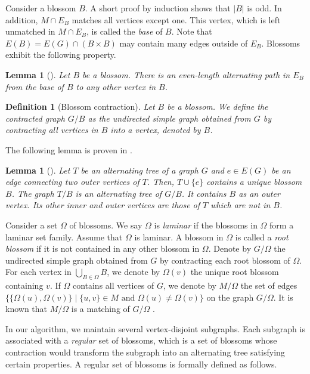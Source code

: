 \documentclass{article}
\newcommand{\Omg}{\Omega}
\newtheorem{lemma}[theorem]{Lemma}
\newtheorem{definition}[theorem]{Definition}
\begin{document}
Consider a blossom $B$.
A short proof by induction shows that $|B|$ is odd.
In addition, $M \cap E_B$ matches all vertices except one.
This vertex, which is left unmatched in $M \cap E_B$, is called the \emph{base} of $B$.
Note that $E(B) = E(G) \cap (B \times B)$ may contain many edges outside of $E_B$.
Blossoms exhibit the following property.

\begin{lemma}[\cite{DP14}]\label{lem:even_path} Let $B$ be a blossom. There is an even-length alternating path in $E_B$ from the base of $B$ to any other vertex in $B$. \end{lemma}

\begin{definition}[Blossom contraction] Let $B$ be a blossom. We define the contracted graph $G / B$ as the undirected simple graph obtained from $G$ by contracting all vertices in $B$ into a vertex, denoted by $B$.
\end{definition}

The following lemma is proven in \cite[Theorem 4.13]{edmonds1965paths}.

\begin{lemma}[\cite{edmonds1965paths}]\label{lem:contraction} Let $T$ be an alternating tree of a graph $G$ and $e \in E(G)$ be an edge connecting two outer vertices of $T$. Then, $T \cup \{e\}$ contains a unique blossom $B$. The graph $T / B$ is an alternating tree of $G / B$. It contains $B$ as an outer vertex. Its other inner and outer vertices are those of $T$ which are not in $B$.
\end{lemma}

Consider a set $\Omg$ of blossoms.
We say $\Omg$ is \emph{laminar} if the blossoms in $\Omg$ form a laminar set family.
Assume that $\Omg$ is laminar.
A blossom in $\Omg$ is called a \emph{root blossom} if it is not contained in any other blossom in $\Omg$.
Denote by $G / \Omg$ the undirected simple graph obtained from $G$ by contracting each root blossom of $\Omg$.
For each vertex in $\bigcup_{B \in \Omg} B$, we denote by $\Omg(v)$ the unique root blossom containing $v$.
If $\Omg$ contains all vertices of $G$, we denote by $M / \Omg$ the set of edges $\{ \{\Omg(u), \Omg(v)\} \mid \{u, v\} \in M \mbox{ and } \Omg(u) \neq \Omg(v) \}$ on the graph $G / \Omg$. It is known that $M / \Omg$ is a matching of $G / \Omg$ \cite{DP14}.

In our algorithm, we maintain several vertex-disjoint subgraphs. Each subgraph is associated with a \emph{regular} set of blossoms, which is a set of blossoms whose contraction would transform the subgraph into an alternating tree satisfying certain properties. A regular set of blossoms is formally defined as follows.
\end{document}
